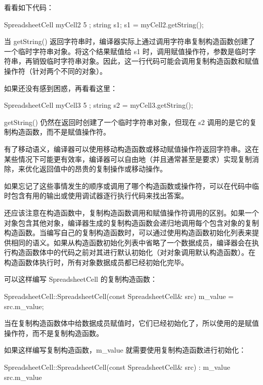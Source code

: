 看看如下代码：

\begin{cpp}
SpreadsheetCell myCell2 { 5 };
string s1;
s1 = myCell2.getString();
\end{cpp}

当 getString() 返回字符串时，编译器实际上通过调用字符串复制构造函数创建了一个临时字符串对象。将这个结果赋值给 s1 时，调用赋值操作符，参数是临时字符串，再销毁临时字符串对象。因此，这一行代码可能会调用复制构造函数和赋值操作符（针对两个不同的对象）。

如果还没有感到困惑，再看看这里：

\begin{cpp}
SpreadsheetCell myCell3 { 5 };
string s2 = myCell3.getString();
\end{cpp}

getString() 仍然在返回时创建了一个临时字符串对象，但现在 s2 调用的是它的复制构造函数，而不是赋值操作符。

有了移动语义，编译器可以使用移动构造函数或移动赋值操作符返回字符串。这在某些情况下可能更有效率，编译器可以自由地（并且通常甚至是要求）实现复制消除，来优化返回值中的昂贵的复制操作或移动操作。

如果忘记了这些事情发生的顺序或调用了哪个构造函数或操作符，可以在代码中临时包含有用的输出或使用调试器逐行执行代码来找出答案。


还应该注意在构造函数中，复制构造函数调用和赋值操作符调用的区别。如果一个对象包含其他对象，编译器生成的复制构造函数会递归地调用每个包含对象的复制构造函数。当编写自己的复制构造函数时，可以通过使用构造函数初始化列表来提供相同的语义。如果从构造函数初始化列表中省略了一个数据成员，编译器会在执行构造函数体中的代码之前对其进行默认初始化（对对象调用默认构造函数）。在构造函数体执行时，所有对象数据成员都已经初始化完毕。

可以这样编写 SpreadsheetCell 的复制构造函数：

\begin{cpp}
SpreadsheetCell::SpreadsheetCell(const SpreadsheetCell& src)
{
    m_value = src.m_value;
}
\end{cpp}

当在复制构造函数体中给数据成员赋值时，它们已经初始化了，所以使用的是赋值操作符，而不是复制构造函数。

如果这样编写复制构造函数，m\_value 就需要使用复制构造函数进行初始化：

\begin{cpp}
SpreadsheetCell::SpreadsheetCell(const SpreadsheetCell& src)
: m_value { src.m_value }
{}
\end{cpp}



















